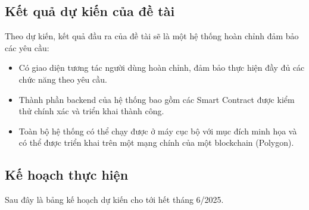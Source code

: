 \documentclass{article}[14pt]
\begin{document}
{    \subsection{Kết quả dự kiến của đề tài}
        Theo dự kiến, kết quả đầu ra của đề tài sẽ là một hệ thống hoàn chỉnh đảm bảo các yêu cầu: 
        \begin{itemize}
            \item Có giao diện tương tác người dùng hoàn chỉnh, đảm bảo thực hiện đầy đủ các chức năng theo yêu cầu. 
            \item Thành phần backend của hệ thống bao gồm các Smart Contract được kiểm thử chính xác và triển khai thành công. 
            \item Toàn bộ hệ thống có thể chạy được ở máy cục bộ với mục đích minh họa và có thể được triển khai trên một mạng chính của một blockchain (Polygon). 
        \end{itemize}
    
    \subsection{Kế hoạch thực hiện}
        Sau đây là bảng kế hoạch dự kiến cho tới hết tháng 6/2025.

}
\end{document}
